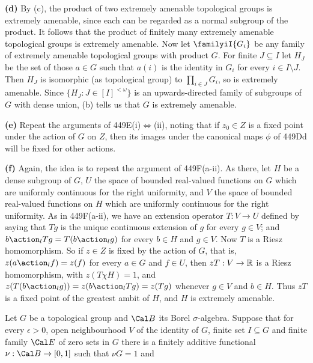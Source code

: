 {\medskip

{\bf (d)} By (c), the product of two extremely amenable topological
groups is extremely amenable, since each can be regarded as a normal
subgroup of the product.   It follows that the product of finitely
many extremely amenable topological groups is extremely amenable.   Now
let $\familyiI{G_i}$
be any family of extremely amenable topological groups with product $G$.
For finite $J\subseteq I$ let $H_J$ be the set of those $a\in G$ such
that $a(i)$ is the identity in $G_i$ for every $i\in I\setminus J$.
Then $H_J$ is isomorphic (as topological group) to $\prod_{i\in J}G_i$,
so is extremely amenable.   Since $\{H_J:J\in[I]^{<\omega}\}$ is an
upwards-directed
family of subgroups of $G$ with dense union, (b) tells us that $G$ is
extremely amenable.

\medskip

{\bf (e)} Repeat the arguments of 449E(i)$\Leftrightarrow$(ii),
noting that if
$z_0\in Z$ is a fixed point under the action of $G$ on $Z$, then its
images under the canonical maps $\phi$ of 449Dd will be fixed for other
actions.

\medskip

{\bf (f)} Again, the idea is to repeat the argument of 449F(a-ii).
As there, let $H$ be a dense subgroup of $G$,
$U$ the space of bounded real-valued functions on $G$ which are uniformly
continuous for the right uniformity, and $V$ the space of bounded
real-valued functions on $H$ which are uniformly continuous for the right
uniformity.   As in 449F(a-ii), we have an extension operator $T:V\to U$
defined
by saying that $Tg$ is the unique continuous extension of $g$ for every
$g\in V$;  and $b\action_lTg=T(b\action_lg)$ for every $b\in H$ and
$g\in V$.   Now $T$ is a Riesz homomorphism.   So if $z\in Z$ is fixed by
the action of $G$, that is, $z(a\action_lf)=z(f)$ for every $a\in G$ and
$f\in U$, then $zT:V\to\Bbb R$ is a Riesz homomorphism, with
$z(T\chi H)=1$, and $z(T(b\action_lg))=z(b\action_lTg)=z(Tg)$ whenever
$g\in V$ and $b\in H$.   Thus $zT$ is a fixed point of the greatest ambit
of $H$, and $H$ is extremely amenable.
}%

Let $G$ be a topological group and $\Cal B$ its
Borel $\sigma$-algebra.   Suppose that
for every $\epsilon>0$, open neighbourhood $V$ of the identity of $G$,
finite set $I\subseteq G$ and finite family $\Cal E$ of zero sets in $G$
there is a finitely additive functional $\nu:\Cal B\to[0,1]$ such that
$\nu G=1$ and

